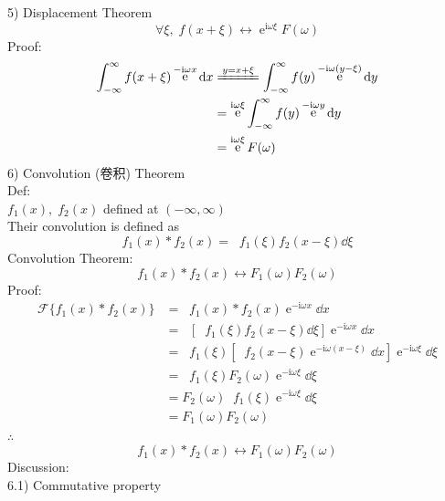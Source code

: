 \documentclass[UTF8]{ctexart} %
\DeclareMathOperator{\intdinf}{\int_{-\infty}^\infty}
\DeclareMathOperator{\e}{\mathrm{e}}
\renewcommand{\I}{\mathrm{i}}
\DeclareMathOperator{\llra}{\longleftrightarrow}
\numberwithin{equation}{section}
\begin{document}
5) Displacement Theorem\\
\begin{equation}\label{key}
\forall \xi,\;f(x+\xi)\llra\e^{\I\omega\xi}F(\omega)
\end{equation}
Proof:\\
\begin{equation}\label{key}
\begin{aligned}
\intdinf f(x+\xi)\e^{-\I\omega x}\dd{x}&\xlongequal{y=x+\xi}\intdinf f(y)\e^{-\I\omega(y-\xi)}\dd{y}\\
&=\e^{\I\omega\xi}\intdinf f(y)\e^{-\I\omega y}\dd{y}\\
&=\e^{\I\omega\xi}F(\omega)
\end{aligned}
\end{equation}
6) Convolution (卷积) Theorem\\
Def:\\
$f_1(x),\;f_2(x)$ defined at $(-\infty,\infty)$\\
Their convolution is defined as\\
\begin{equation}\label{key}
f_1(x)*f_2(x)=\intdinf f_1(\xi)f_2(x-\xi)\dd{\xi}
\end{equation}
Convolution Theorem:\\
\begin{equation}\label{key}
f_1(x)*f_2(x)\llra F_1(\omega)F_2(\omega)
\end{equation}
Proof:\\
\begin{equation}\label{key}
\begin{aligned}
\mathcal{F}\{f_1(x)*f_2(x)\}&=\intdinf f_1(x)*f_2(x)\e^{-\I\omega x}\dd x\\
&=\intdinf\left[\intdinf f_1(\xi)f_2(x-\xi)\dd{\xi}\right]\e^{-\I\omega x}\dd x\\
&=\intdinf f_1(\xi)\left[\intdinf f_2(x-\xi)\e^{-\I\omega (x-\xi)}\dd x\right]\e^{-\I\omega\xi}\dd{\xi}\\
&=\intdinf f_1(\xi)F_2(\omega)\e^{-\I\omega\xi}\dd{\xi}\\
&=F_2(\omega)\intdinf f_1(\xi)\e^{-\I\omega\xi}\dd{\xi}\\
&=F_1(\omega)F_2(\omega)
\end{aligned}
\end{equation}
$\therefore$
\begin{equation}\label{key}
f_1(x)*f_2(x)\llra F_1(\omega)F_2(\omega)
\end{equation}
Discussion:\\
6.1) Commutative property
\end{document}
